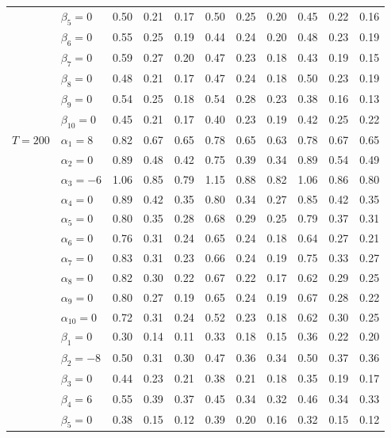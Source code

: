 \begin{table}[htbp]
\begin{tabular}{ll|ccc|ccc|ccc}
  & $\beta_5=0$ & 0.50 & 0.21 & 0.17 & 0.50 & 0.25 & 0.20 & 0.45 & 0.22 & 0.16 \\ 
  & $\beta_6=0$ & 0.55 & 0.25 & 0.19 & 0.44 & 0.24 & 0.20 & 0.48 & 0.23 & 0.19 \\ 
  & $\beta_7=0$ & 0.59 & 0.27 & 0.20 & 0.47 & 0.23 & 0.18 & 0.43 & 0.19 & 0.15 \\ 
  & $\beta_8=0$ & 0.48 & 0.21 & 0.17 & 0.47 & 0.24 & 0.18 & 0.50 & 0.23 & 0.19 \\ 
  & $\beta_9=0$ & 0.54 & 0.25 & 0.18 & 0.54 & 0.28 & 0.23 & 0.38 & 0.16 & 0.13 \\ 
  & $\beta_{10}=0$ & 0.45 & 0.21 & 0.17 & 0.40 & 0.23 & 0.19 & 0.42 & 0.25 & 0.22 \\ 
  \hline
  \multirow{20}{*}{$T=200$} & $\alpha_1=8$ & 0.82 & 0.67 & 0.65 & 0.78 & 0.65 & 0.63 & 0.78 & 0.67 & 0.65 \\ 
  & $\alpha_2=0$ & 0.89 & 0.48 & 0.42 & 0.75 & 0.39 & 0.34 & 0.89 & 0.54 & 0.49 \\ 
  & $\alpha_3=-6$ & 1.06 & 0.85 & 0.79 & 1.15 & 0.88 & 0.82 & 1.06 & 0.86 & 0.80 \\ 
  & $\alpha_4=0$ & 0.89 & 0.42 & 0.35 & 0.80 & 0.34 & 0.27 & 0.85 & 0.42 & 0.35 \\ 
  & $\alpha_5=0$ & 0.80 & 0.35 & 0.28 & 0.68 & 0.29 & 0.25 & 0.79 & 0.37 & 0.31 \\ 
  & $\alpha_6=0$ & 0.76 & 0.31 & 0.24 & 0.65 & 0.24 & 0.18 & 0.64 & 0.27 & 0.21 \\ 
  & $\alpha_7=0$ & 0.83 & 0.31 & 0.23 & 0.66 & 0.24 & 0.19 & 0.75 & 0.33 & 0.27 \\ 
  & $\alpha_8=0$ & 0.82 & 0.30 & 0.22 & 0.67 & 0.22 & 0.17 & 0.62 & 0.29 & 0.25 \\ 
  & $\alpha_9=0$ & 0.80 & 0.27 & 0.19 & 0.65 & 0.24 & 0.19 & 0.67 & 0.28 & 0.22 \\ 
  & $\alpha_{10}=0$ & 0.72 & 0.31 & 0.24 & 0.52 & 0.23 & 0.18 & 0.62 & 0.30 & 0.25 \\ 
  & $\beta_1=0$ & 0.30 & 0.14 & 0.11 & 0.33 & 0.18 & 0.15 & 0.36 & 0.22 & 0.20 \\ 
  & $\beta_2=-8$ & 0.50 & 0.31 & 0.30 & 0.47 & 0.36 & 0.34 & 0.50 & 0.37 & 0.36 \\ 
  & $\beta_3=0$ & 0.44 & 0.23 & 0.21 & 0.38 & 0.21 & 0.18 & 0.35 & 0.19 & 0.17 \\ 
  & $\beta_4=6$ & 0.55 & 0.39 & 0.37 & 0.45 & 0.34 & 0.32 & 0.46 & 0.34 & 0.33 \\ 
  & $\beta_5=0$ & 0.38 & 0.15 & 0.12 & 0.39 & 0.20 & 0.16 & 0.32 & 0.15 & 0.12 \\ 

\end{tabular}
\end{table}
